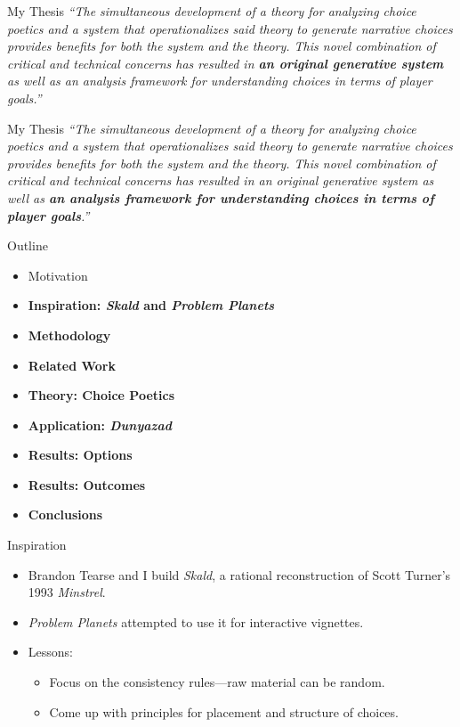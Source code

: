 \documentclass[xcolor=x11names]{beamer}
\def\dunyazad/{\textit{Dunyazad}}
\def\minstrel/{\textit{Minstrel}}
\def\skald/{\textit{Skald}}
\def\problemplanets/{\textit{Problem Planets}}
\begin{document}
\begin{frame}{My Thesis}
  \justifying
  \itshape
  ``The simultaneous development of a theory for analyzing choice poetics and a system that operationalizes said theory to generate narrative choices provides benefits for both the system and the theory. This novel combination of critical and technical concerns has resulted in \textbf{an original generative system} as well as an analysis framework for understanding choices in terms of player goals.''
\end{frame}

\begin{frame}{My Thesis}
  \justifying
  \itshape
  ``The simultaneous development of a theory for analyzing choice poetics and a system that operationalizes said theory to generate narrative choices provides benefits for both the system and the theory. This novel combination of critical and technical concerns has resulted in an original generative system as well as \textbf{an analysis framework for understanding choices in terms of player goals}.''
\end{frame}

\begin{frame}{Outline}
  \begin{itemize}
    \item Motivation
    \item \textbf{Inspiration: \skald/ and \problemplanets/}
    \item \textbf{Methodology}
    \item \textbf{Related Work}
    \item \textbf{Theory: Choice Poetics}
    \item \textbf{Application: \dunyazad/}
    \item \textbf{Results: Options}
    \item \textbf{Results: Outcomes}
    \item \textbf{Conclusions}
  \end{itemize}
\end{frame}

\begin{frame}{Inspiration}
  \vfill
  \begin{itemize}\addtolength{\itemsep}{0.5\baselineskip}
    \item Brandon Tearse and I build \skald/, a rational reconstruction of Scott Turner's 1993 \minstrel/.
    \item \problemplanets/ attempted to use it for interactive vignettes.
    \item Lessons:
    \begin{itemize}\addtolength{\itemsep}{0.5\baselineskip}
      \vspace{0.5\baselineskip}
      \item Focus on the consistency rules---raw material can be random.
      \item Come up with principles for placement and structure of choices.
    \end{itemize}
  \end{itemize}
  \vfill
  \centering
  \tiny
   \\
\end{frame}
\end{document}
